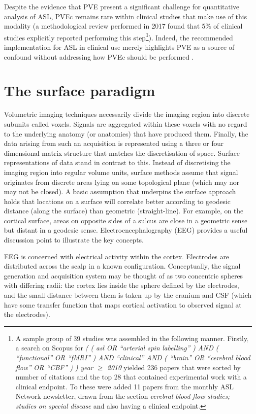 Despite the evidence that PVE present a significant challenge for quantitative analysis of ASL, PVEc remains rare within clinical studies that make use of this modality (a methodological review performed in 2017 found that 5\% of clinical studies explicitly reported performing this step\footnote{A sample group of 39 studies was assembled in the following manner. Firstly, a search on Scopus for \textit{( ( asl OR “arterial spin labelling” ) AND ( “functional” OR “fMRI” ) AND “clinical” AND ( “brain” OR “cerebral blood flow” OR “CBF” ) ) year $\geq$ 2010} yielded 236 papers that were sorted by number of citations and the top 28 that contained experimental work with a clinical endpoint. To these were added 11 papers from the monthly ASL Network newsletter, drawn from the section \textit{cerebral blood flow studies; studies on special disease} and also having a clinical endpoint.}). Indeed, the recommended implementation for ASL in clinical use merely highlights PVE as a source of confound without addressing how PVEc should be performed \cite{Alsop2015}. 


\section{The surface paradigm}

Volumetric imaging techniques necessarily divide the imaging region into discrete subunits called voxels. Signals are aggregated within these voxels with no regard to the underlying anatomy (or anatomies) that have produced them. Finally, the data arising from such an acquisition is represented using a three or four dimensional matrix structure that matches the discretisation of space. Surface representations of data stand in contrast to this. Instead of discretising the imaging region into regular volume units, surface methods assume that signal originates from discrete areas lying on some topological plane (which may nor may not be closed). A basic assumption that underpins the surface approach holds that locations on a surface will correlate better according to geodesic distance (along the surface) than geometric (straight-line). For example, on the cortical surface, areas on opposite sides of a sulcus are close in a geometric sense but distant in a geodesic sense. Electroencephalography (EEG) provides a useful discussion point to illustrate the key concepts. 

EEG is concerned with electrical activity within the cortex. Electrodes are distributed across the scalp in a known configuration. Conceptually, the signal generation and acquisition system may be thought of as two concentric spheres with differing radii: the cortex lies inside the sphere defined by the electrodes, and the small distance between them is taken up by the cranium and CSF (which have some transfer function that maps cortical activation to observed signal at the electrodes). 

